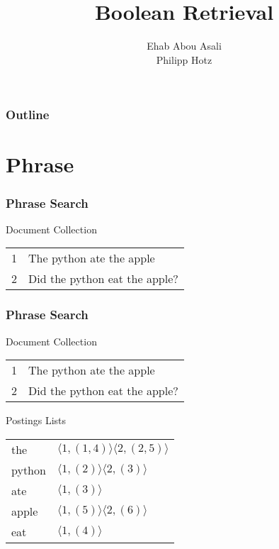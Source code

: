 \documentclass{beamer}
\title{Boolean Retrieval}
\author{Ehab Abou Asali\\ Philipp Hotz}
\begin{document}
\begin{frame}

  \frametitle{Outline}
  \tableofcontents[pausesections]
\end{frame}

\section{Phrase}

\begin{frame}
  \frametitle{Phrase Search}

  \begin{block}{Document Collection}

    \begin{tabular}{ l | l }
      1 & The python ate the apple \\
      2 & Did the python eat the apple? \\
    \end{tabular}

  \end{block}

\end{frame}

\begin{frame}
  \frametitle{Phrase Search}

  \begin{block}{Document Collection}

    \begin{tabular}{ l | l }
      1 & The python ate the apple \\
      2 & Did the python eat the apple? \\
    \end{tabular}

  \end{block}

  \begin{block}{Postings Lists}
    \begin{tabular}{ l | l }
      the & $ \langle 1,(1,4) \rangle \langle 2,(2,5) \rangle $ \\
      python & $ \langle 1,(2) \rangle \langle 2,(3) \rangle $ \\
      ate & $ \langle 1,(3) \rangle $ \\
      apple & $ \langle 1,(5) \rangle \langle 2,(6) \rangle $ \\
      eat & $ \langle 1,(4) \rangle $ \\
    \end{tabular}
  \end{block}

\end{frame}
\end{document}
